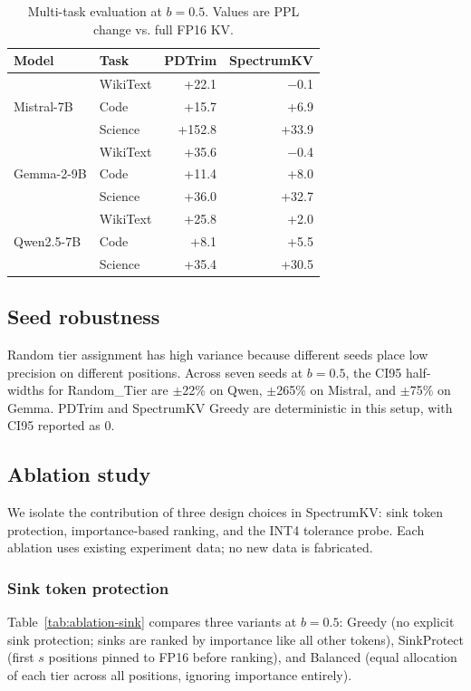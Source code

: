 \documentclass[11pt]{article}
\newcommand{\method}{SpectrumKV}
\newcommand{\budget}{b}
\newcommand{\pct}{\%}
\theoremstyle{plain}
\theoremstyle{definition}
\begin{document}
\begin{table}[h]
\centering
\caption{Multi-task evaluation at $\budget=0.5$.  Values are PPL change vs. full FP16 KV.}
\label{tab:tasks}
\small
\begin{tabular}{llrr}
\toprule
Model & Task & PDTrim & \method{} \\
\midrule
\multirow{3}{*}{Mistral-7B} & WikiText & +22.1 & $-$0.1 \\
 & Code & +15.7 & +6.9 \\
 & Science & +152.8 & +33.9 \\
\midrule
\multirow{3}{*}{Gemma-2-9B} & WikiText & +35.6 & $-$0.4 \\
 & Code & +11.4 & +8.0 \\
 & Science & +36.0 & +32.7 \\
\midrule
\multirow{3}{*}{Qwen2.5-7B} & WikiText & +25.8 & +2.0 \\
 & Code & +8.1 & +5.5 \\
 & Science & +35.4 & +30.5 \\
\bottomrule
\end{tabular}
\end{table}

\subsection{Seed robustness}
Random tier assignment has high variance because different seeds place low precision on different positions.  Across seven seeds at $\budget=0.5$, the CI95 half-widths for Random\_Tier are $\pm$22\pct{} on Qwen, $\pm$265\pct{} on Mistral, and $\pm$75\pct{} on Gemma.  PDTrim and \method{} Greedy are deterministic in this setup, with CI95 reported as 0.

\subsection{Ablation study}
\label{sec:ablation}

We isolate the contribution of three design choices in \method{}: sink token protection, importance-based ranking, and the INT4 tolerance probe.  Each ablation uses existing experiment data; no new data is fabricated.

\subsubsection{Sink token protection}
\label{sec:ablation-sink}

Table~\ref{tab:ablation-sink} compares three variants at $\budget=0.5$: Greedy (no explicit sink protection; sinks are ranked by importance like all other tokens), SinkProtect (first $s$ positions pinned to FP16 before ranking), and Balanced (equal allocation of each tier across all positions, ignoring importance entirely).
\end{document}
